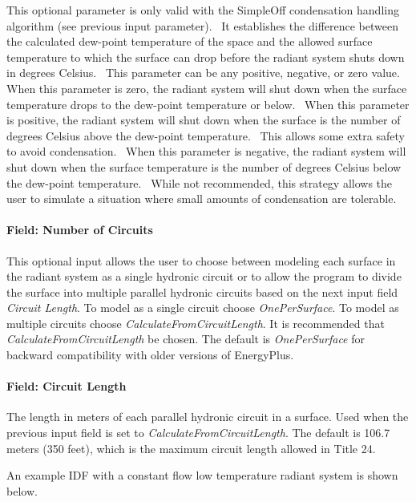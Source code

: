 This optional parameter is only valid with the SimpleOff condensation handling algorithm (see previous input parameter).~ It establishes the difference between the calculated dew-point temperature of the space and the allowed surface temperature to which the surface can drop before the radiant system shuts down in degrees Celsius.~ This parameter can be any positive, negative, or zero value.~ When this parameter is zero, the radiant system will shut down when the surface temperature drops to the dew-point temperature or below.~ When this parameter is positive, the radiant system will shut down when the surface is the number of degrees Celsius above the dew-point temperature.~ This allows some extra safety to avoid condensation.~ When this parameter is negative, the radiant system will shut down when the surface temperature is the number of degrees Celsius below the dew-point temperature.~ While not recommended, this strategy allows the user to simulate a situation where small amounts of condensation are tolerable.

\paragraph{Field: Number of Circuits}\label{field-number-of-circuits-1}

This optional input allows the user to choose between modeling each surface in the radiant system as a single hydronic circuit or to allow the program to divide the surface into multiple parallel hydronic circuits based on the next input field \emph{Circuit Length}. To model as a single circuit choose \emph{OnePerSurface}. To model as multiple circuits choose \emph{CalculateFromCircuitLength}. It is recommended that \emph{CalculateFromCircuitLength} be chosen. The default is \emph{OnePerSurface} for backward compatibility with older versions of EnergyPlus.

\paragraph{Field: Circuit Length}\label{field-circuit-length-1}

The length in meters of each parallel hydronic circuit in a surface. Used when the previous input field is set to \emph{CalculateFromCircuitLength}. The default is 106.7 meters (350 feet), which is the maximum circuit length allowed in Title 24.

An example IDF with a constant flow low temperature radiant system is shown below.

